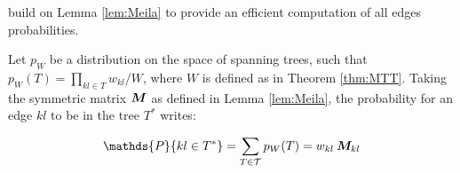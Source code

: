\cite{kirshner} build on Lemma \ref{lem:Meila} to provide an efficient computation of all edges probabilities.
\begin{lemma}  \label{lem:Kirshner}
    Let $p_W$ be a distribution on the space of spanning trees, such that $p_W(T)=\prod_{kl\in T} w_{kl} / W$, where $W$ is defined as in Theorem \ref{thm:MTT}. Taking the symmetric matrix ${\boldsymbol{M}}$ as defined in Lemma  \ref{lem:Meila}, the probability for an edge $kl$ to be in the tree $T^*$ writes:
 
$$\mathds{P}\{kl\in T^*\} = \sum_{T\in \mathcal{T}} p_W(T)= w_{kl}\: \Mbf_{kl}$$
\end{lemma}

